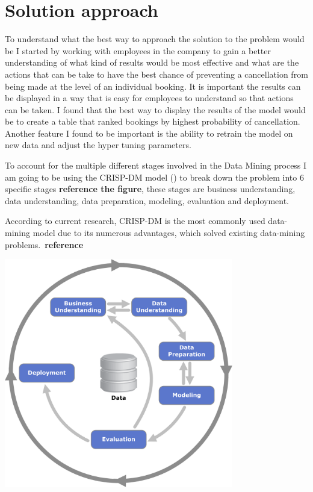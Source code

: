 \section{Solution approach}
To understand what the best way to approach the solution to the problem would be I started by working with employees in the company to gain a better understanding of what kind of results would be most effective and what are the actions that can be take to have the best chance of preventing a cancellation from being made at the level of an individual booking. It is important the results can be displayed in a way that is easy for employees to understand so that actions can be taken. I found that the best way to display the results of the model would be to create a table that ranked bookings by highest probability of cancellation. Another feature I found to be important is the ability to retrain the model on new data and adjust the hyper tuning parameters.

To account for the multiple different stages involved in the Data Mining process I am going to be using the CRISP-DM model (\cite{WirthCRISP-DM:Mining}) to break down the problem into 6 specific stages \textbf{reference the figure}, these stages are business understanding, data understanding, data preparation, modeling, evaluation and deployment.

According to current research, CRISP-DM is the most commonly used data-mining model due to its numerous advantages, which solved existing data-mining problems. \textbf{reference} 


\vspace{5mm}


 \includegraphics[width=10cm]{figures/CRISPDM_Process_Diagram.png}
 



